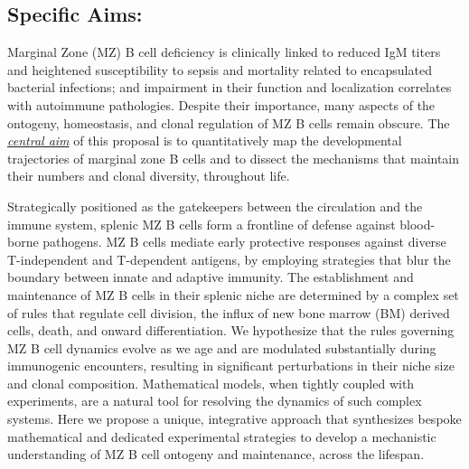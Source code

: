 \documentclass[11pt]{article} %
\begin{document}
\pagestyle{empty}
\subsection*{Specific Aims:}

Marginal Zone (MZ) B cell deficiency is clinically linked to reduced IgM titers and heightened susceptibility to sepsis and mortality related to encapsulated bacterial infections; and impairment in their function and localization correlates with autoimmune pathologies.
Despite their importance, many aspects of the ontogeny,  homeostasis, and clonal regulation of MZ B cells remain obscure.
The \textit{\underline{central aim}} of this proposal is to quantitatively map the developmental trajectories of marginal zone B cells and to dissect the mechanisms that maintain their numbers and clonal diversity, throughout life.


Strategically positioned as the gatekeepers between the circulation and the immune system, splenic MZ B cells form a frontline of defense against blood-borne pathogens.  
MZ B cells mediate early protective responses against diverse T-independent and T-dependent antigens, by employing strategies that blur the boundary between innate and adaptive immunity.
The establishment and maintenance of MZ B cells in their splenic niche are determined by a complex set of rules that regulate cell division, the influx of new bone marrow (BM) derived cells, death, and onward differentiation. 
We hypothesize that the rules governing MZ B cell dynamics evolve as we age and are modulated substantially during immunogenic encounters, resulting in significant perturbations in their niche size and clonal composition.
Mathematical models, when tightly coupled with experiments, are a natural tool for resolving the dynamics of such complex systems.
Here we propose a unique, integrative approach that synthesizes bespoke mathematical and dedicated experimental strategies to develop a mechanistic understanding of MZ B cell ontogeny and maintenance, across the lifespan. 
\end{document}
